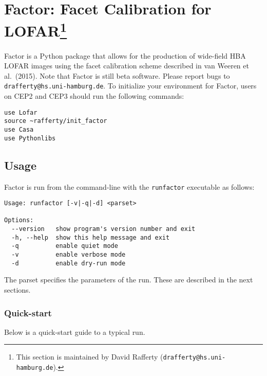 \documentclass[structabstract]{article}
\begin{document}

\section[Factor: Facet Calibration for LOFAR]{Factor: Facet Calibration for
LOFAR\footnote{This section is maintained by David Rafferty
({\tt drafferty@hs.uni-hamburg.de}).}}
\label{factor}

Factor is a Python package that allows for the production of wide-field HBA
LOFAR images using the facet calibration scheme described in van Weeren et al.\
(2015). Note that Factor is still beta software. Please report bugs to
{\tt drafferty@hs.uni-hamburg.de}. To initialize your environment for Factor,
users on CEP2 and CEP3 should run the following commands:
\begin{verbatim}
use Lofar
source ~rafferty/init_factor
use Casa
use Pythonlibs
\end{verbatim}

\subsection{Usage}
\label{factor:usage}

Factor is run from the command-line with the {\tt runfactor} executable as
follows:
\begin{verbatim}
Usage: runfactor [-v|-q|-d] <parset>

Options:
  --version   show program's version number and exit
  -h, --help  show this help message and exit
  -q          enable quiet mode
  -v          enable verbose mode
  -d          enable dry-run mode
\end{verbatim}
The parset specifies the parameters of the run. These are described in the next
sections.

\subsubsection{Quick-start}
\label{factor:quick-start}
Below is a quick-start guide to a typical run.
\end{document}
